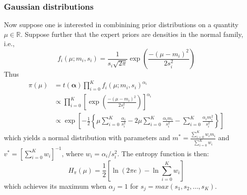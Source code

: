 \documentclass[a4paper, notitlepage, 10pt]{article}
\begin{document}
\subsubsection*{Gaussian distributions} 
\label{sec:normal}
Now suppose one is interested in combinining prior distributions on a quantity $\mu \in \mathbb{R}$.
Suppose further that the expert priors are densities in the normal family, i.e.,
$$ f_i(\mu; m_i,s_i) = \frac{1}{s_i\sqrt{2\pi}} \exp\left(\frac{-(\mu-m_i)^2}{2s_i^2}\right) $$
Thus 
\begin{align}
\pi(\mu)&= t(\boldsymbol\alpha)\prod_{i=0}^{K}f_i(\mu; m_i, s_i)^{\alpha_i}\\
&\propto \prod_{i=0}^{K} \left[ \exp\left(\frac{-(\mu-m_i)^2}{2s_i^2}\right) \right]^{\alpha_i}\\
&\propto \exp\left[-\frac{1}{2}\left\{\mu\sum_{i=0}^K\frac{\alpha_i}{s_i^2} - 2\mu\sum_{i=0}^K \frac{\alpha_im_i}{s_i^2} - \sum_{i=0}^K\frac{\alpha_im_i^2}{s_i^2} \right\}\right]
\end{align}
which yields a normal distribution with parameters and $m^* = \frac{\sum_{i=0}^K w_im_i}{\sum_{i=0}^K w_i}$ and $v^* = [\sum_{i=0}^K w_i]^{-1}$,  where $w_i = \alpha_i/s_i^2$.
The entropy function is then:
\begin{equation}
 \label{eq:normalpoolentropy}
 H_{\pi}(\mu) = \frac{1}{2}\left[ \ln(2\pi e) - \ln\sum_{i=0}^K w_i\right]
\end{equation}
which achieves its maximum when $\alpha_j = 1$ for $s_j = max(s_1, s_2, \ldots, s_K)$.
\end{document}
